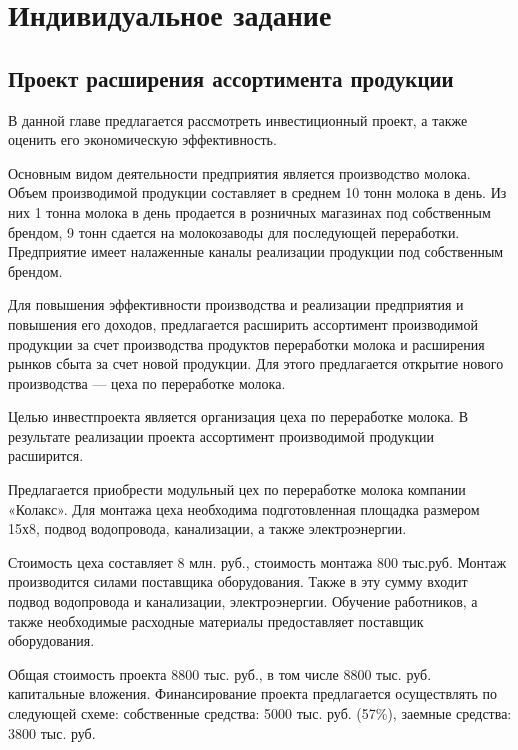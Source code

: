 \section{Индивидуальное задание}
\subsection{Проект расширения ассортимента продукции}
В данной главе предлагается рассмотреть инвестиционный проект, а также оценить его экономическую эффективность.

Основным видом деятельности предприятия является производство молока. Объем производимой продукции составляет в среднем 10 тонн молока в день. Из них 1 тонна молока в день продается в розничных магазинах под собственным брендом, 9 тонн сдается на молокозаводы для последующей переработки. %
Предприятие имеет налаженные каналы реализации продукции под собственным брендом. 

Для повышения эффективности производства и реализации предприятия и повышения его доходов, предлагается расширить ассортимент производимой продукции за счет производства продуктов переработки молока и расширения рынков сбыта за счет новой продукции. Для этого предлагается открытие нового производства --- цеха по переработке молока.

Целью инвестпроекта является организация цеха по переработке молока. В результате реализации проекта ассортимент производимой продукции расширится. 

Предлагается приобрести модульный цех по переработке молока компании «Колакс». Для монтажа цеха необходима подготовленная площадка размером 15х8, подвод водопровода, канализации, а также электроэнергии.

Стоимость цеха составляет 8 млн. руб., стоимость монтажа 800 тыс.руб. Монтаж производится силами поставщика оборудования. Также в эту сумму входит подвод водопровода и канализации, электроэнергии. Обучение работников, а также необходимые расходные материалы предоставляет поставщик оборудования.

Общая стоимость проекта 8800 тыс. руб., в том числе 8800 тыс. руб. капитальные вложения. Финансирование проекта предлагается осуществлять по следующей схеме: собственные средства: 5000 тыс. руб. (57\%), заемные средства: 3800 тыс. руб.


